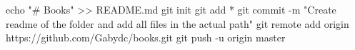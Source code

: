 echo "# Books" >> README.md
git init
git add *
git commit -m "Create readme of the folder and add all files in the actual path"
git remote add origin https://github.com/Gabydc/books.git
git push -u origin master
